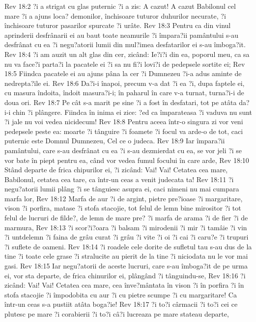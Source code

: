 Rev 18:2  ?i a strigat cu glas puternic ?i a zis: A cazut! A cazut Babilonul cel mare ?i a ajuns loca? demonilor, închisoare tuturor duhurilor necurate, ?i închisoare tuturor pasarilor spurcate ?i urâte.
Rev 18:3  Pentru ca din vinul aprinderii desfrânarii ei au baut toate neamurile ?i împara?ii pamântului s-au desfrânat cu ea ?i negu?atorii lumii din mul?imea desfatarilor ei s-au îmboga?it.
Rev 18:4  ?i am auzit un alt glas din cer, zicând: Ie?i?i din ea, poporul meu, ca sa nu va face?i parta?i la pacatele ei ?i sa nu fi?i lovi?i de pedepsele sortite ei;
Rev 18:5  Fiindca pacatele ei au ajuns pâna la cer ?i Dumnezeu ?i-a adus aminte de nedrepta?ile ei.
Rev 18:6  Da?i-i înapoi, precum v-a dat ?i ea ?i, dupa faptele ei, cu masura îndoita, îndoit masura?i-i; în paharul în care v-a turnat, turna?i-i de doua ori.
Rev 18:7  Pe cât s-a marit pe sine ?i a fost în desfatari, tot pe atâta da?i-i chin ?i plângere. Fiindca în inima ei zice: ?ed ca împarateasa ?i vaduva nu sunt ?i jale nu voi vedea nicidecum!
Rev 18:8  Pentru aceea într-o singura zi vor veni pedepsele peste ea: moarte ?i tânguire ?i foamete ?i focul va arde-o de tot, caci puternic este Domnul Dumnezeu, Cel ce o judeca.
Rev 18:9  Iar împara?ii pamântului, care s-au desfrânat cu ea ?i s-au dezmierdat cu ea, se vor jeli ?i se vor bate în piept pentru ea, când vor vedea fumul focului în care arde,
Rev 18:10  Stând departe de frica chipurilor ei, ?i zicând: Vai! Vai! Cetatea cea mare, Babilonul, cetatea cea tare, ca într-un ceas a venit judecata ta!
Rev 18:11  ?i negu?atorii lumii plâng ?i se tânguiesc asupra ei, caci nimeni nu mai cumpara marfa lor,
Rev 18:12  Marfa de aur ?i de argint, pietre pre?ioase ?i margaritare, vison ?i porfira, matase ?i stofa stacojie, tot felul de lemn bine mirositor ?i tot felul de lucruri de filde?, de lemn de mare pre? ?i marfa de arama ?i de fier ?i de marmura,
Rev 18:13  ?i scor?i?oara ?i balsam ?i mirodenii ?i mir ?i tamâie ?i vin ?i untdelemn ?i faina de grâu curat ?i grâu ?i vite ?i oi ?i cai ?i caru?e ?i trupuri ?i suflete de oameni.
Rev 18:14  ?i roadele cele dorite de sufletul tau s-au dus de la tine ?i toate cele grase ?i stralucite au pierit de la tine ?i niciodata nu le vor mai gasi.
Rev 18:15  Iar negu?atorii de aceste lucruri, care s-au îmboga?it de pe urma ei, vor sta departe, de frica chinurilor ei, plângând ?i tânguindu-se,
Rev 18:16  ?i zicând: Vai! Vai! Cetatea cea mare, cea înve?mântata în vison ?i în porfira ?i în stofa stacojie ?i împodobita cu aur ?i cu pietre scumpe ?i cu margaritare! Ca într-un ceas s-a pustiit atâta boga?ie!
Rev 18:17  ?i to?i cârmacii ?i to?i cei ce plutesc pe mare ?i corabierii ?i to?i câ?i lucreaza pe mare stateau departe,
